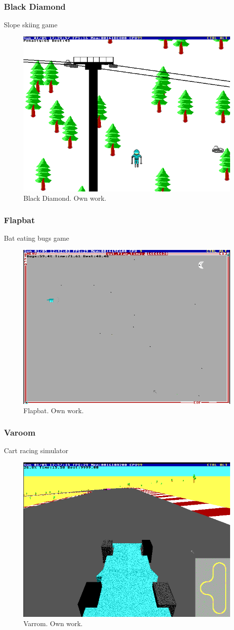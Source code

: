 \documentclass{beamer}
\begin{document}
	\begin{frame}
		\frametitle{Black Diamond}
		Slope skiing game
		\begin{figure}
			\centering
			\includegraphics[width=0.6\linewidth]{images/black_diamond.png}
			\caption{Black Diamond. Own work.}
			\label{fig:black_diamond}
		\end{figure}
	\end{frame}

	\begin{frame}
		\frametitle{Flapbat}
		Bat eating bugs game
		\begin{figure}
			\centering
			\includegraphics[width=0.6\linewidth]{images/flapbat.png}
			\caption{Flapbat. Own work.}
			\label{fig:flapbat}
		\end{figure}
	\end{frame}

	\begin{frame}
		\frametitle{Varoom}
		Cart racing simulator
		\begin{figure}
			\centering
			\includegraphics[width=0.6\linewidth]{images/varoom.png}
			\caption{Varrom. Own work.}
			\label{fig:varoom}
		\end{figure}
	\end{frame}
\end{document}
